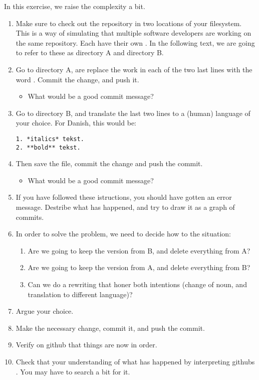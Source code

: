 In this exercise, we raise the complexity a bit.

\begin{enumerate}
  \item Make sure to check out the  repository in two locations of your filesystem. This is a way of simulating that multiple software developers are working on the same repository. Each have their own . In the following text, we are going to refer to these as directory A and directory B.
  \item Go to directory A, are replace the work  in each of the two last lines with the word . Commit the change, and push it.
    \begin{itemize}
      \item What would be a good commit message?
    \end{itemize}
  \item Go to directory B, and translate the last two lines to a (human) language of your choice. For Danish, this would be:
    \begin{verbatim}
1. *italics* tekst.
2. **bold** tekst.
    \end{verbatim}
  \item Then save the file, commit the change and push the commit.
    \begin{itemize}
      \item What would be a good commit message?
    \end{itemize}
  \item If you have followed these istructions, you should have gotten an error message. Destribe what has happened, and try to draw it as a graph of commits.
  \item In order to solve the problem, we need to decide how to  the situation:
    \begin{enumerate}
      \item Are we going to keep the version from B, and delete everything from A?
      \item Are we going to keep the version from A, and delete everything from B?
      \item Can we do a rewriting that honer both intentions (change of noun, and translation to different language)?
    \end{enumerate}
  \item Argue your choice.
  \item Make the necessary change, commit it, and push the commit.
  \item Verify on github that things are now in order.
  \item Check that your understanding of what has happened by interpreting githubs . You may have to search a bit for it.
\end{enumerate}

